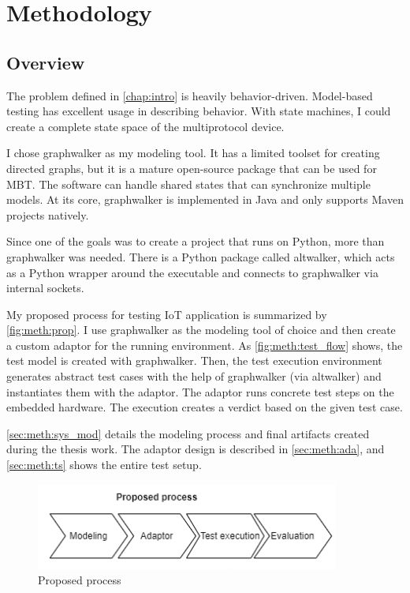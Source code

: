 \chapter{Methodology}
\label{chap:methodology}

\section{Overview}
\label{sec:meth:ov}

The problem defined in \autoref{chap:intro} is heavily behavior-driven. Model-based testing has excellent usage in describing behavior. With state machines, I could create a complete state space of the multiprotocol device.

I chose graphwalker as my modeling tool. It has a limited toolset for creating directed graphs, but it is a mature open-source package that can be used for MBT. The software can handle shared states that can synchronize multiple models. At its core, graphwalker is implemented in Java and only supports Maven projects natively.

Since one of the goals was to create a project that runs on Python, more than graphwalker was needed. There is a Python package called altwalker, which acts as a Python wrapper around the executable and connects to graphwalker via internal sockets.

My proposed process for testing IoT application is summarized by \autoref{fig:meth:prop}. I use graphwalker as the modeling tool of choice and then create a custom adaptor for the running environment. As \autoref{fig:meth:test_flow} shows, the test model is created with graphwalker. Then, the test execution environment generates abstract test cases with the help of graphwalker (via altwalker) and instantiates them with the adaptor. The adaptor runs concrete test steps on the embedded hardware. The execution creates a verdict based on the given test case.

\autoref{sec:meth:sys_mod} details the modeling process and final artifacts created during the thesis work. The adaptor design is described in \autoref{sec:meth:ada}, and \autoref{sec:meth:ts} shows the entire test setup.

\begin{figure}
    \centering
    \includegraphics[width=100mm, keepaspectratio]{figures/proposed_process.png}
    \caption{Proposed process}
    \label{fig:meth:prop}
\end{figure}

